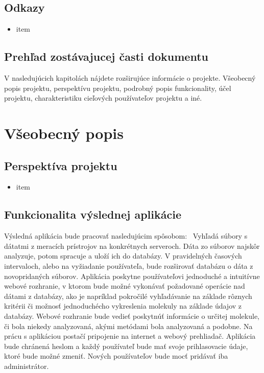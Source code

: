 \documentclass[12pt,a4paper]{article}
\begin{document}
\subsection{Odkazy}
\begin{itemize}
	\item item
\end{itemize}

\subsection{Prehľad zostávajucej časti dokumentu}
V nasledujúcich kapitolách nájdete rozširujúce informácie o projekte.
Všeobecný popis projektu, perspektívu projektu, podrobný popis funkcionality, účel projektu, charakteristiku cieľových používateľov projektu a iné.


\section{Všeobecný popis}


\subsection{Perspektíva projektu}
\begin{itemize}
	\item item
\end{itemize}

\subsection{Funkcionalita výslednej aplikácie}
Výsledná aplikácia bude pracovať nasledujúcim spôsobom: \
Vyhľadá súbory s dátatmi z meracích prístrojov na konkrétnych serveroch. Dáta zo súborov najskôr analyzuje, potom spracuje a uloží ich do databázy.
V pravidelných časových intervaloch, alebo na vyžiadanie používateľa, bude rozširovať databázu o dáta z novopridaných súborov. Aplikácia poskytne používateľovi jednoduché a intuitívne webové rozhranie, v ktorom bude možné vykonávať požadované operácie nad dátami z databázy, ako je napríklad pokročilé vyhľadávanie na základe rôznych kritérii či možnosť jednoduchécho vykreslenia molekuly na základe údajov z databázy. Webové rozhranie bude vedieť poskytnúť informácie o určitej molekule, či bola niekedy analyzovaná, akými metódami bola analyzovaná a podobne. Na prácu s aplikáciou postačí pripojenie na internet a webový prehliadač. Aplikácia bude chránená heslom a každý používateľ bude mať svoje prihlasovacie údaje, ktoré bude možné zmeniť. Nových používateľov bude mocť pridávať iba administrátor.
\end{document}
